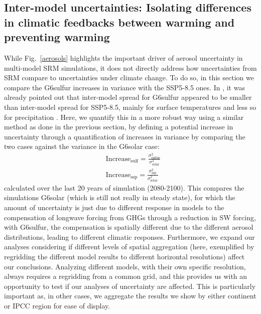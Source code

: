 \documentclass[acp, manuscript]{copernicus}
\begin{document}
\subsection{Inter-model uncertainties: Isolating differences in climatic feedbacks between warming and preventing warming}

While Fig.~\ref{aerosols} highlights the important driver of aerosol uncertainty in multi-model SRM simulations, it does not directly address how uncertainties from SRM compare to uncertainties under climate change. To do so, in this section we compare the G6sulfur increases in variance with the SSP5-8.5 ones. In \cite{Visioni2021}, it was already pointed out that inter-model spread for G6sulfur appeared to be smaller than inter-model spread for SSP5-8.5, mainly for surface temperatures and less so for precipitation \citep[e.g.,][]{MarMartin2015}. Here, we quantify this in a more robust way using a similar method as done in the previous section, by defining a potential increase in uncertainty through a quantification of increases in variance by comparing the two cases against the variance in the G6solar case:
\begin{align}
    &\mbox{Increase}_{\mathrm{sulf}} = \frac{\sigma^2_{\mathrm{sulfur}}}{\sigma^2_{\mathrm{solar}}}\label{eqn.increase.sulf} \\ &\mbox{Increase}_{\mathrm{ssp}} = \frac{\sigma^2_{\mathrm{ssp}}}{\sigma^2_{\mathrm{solar}}}\label{eqn.increase.solar}
\end{align}
calculated over the last 20 years of simulation (2080-2100). This compares the simulations G6solar (which is still not really in steady state), for which the amount of uncertainty is just due to different response in models to the compensation of longwave forcing from GHGs through a reduction in SW forcing, with G6sulfur, the compensation is spatially different due to the different aerosol distributions, leading to different climatic responses. Furthermore, we expand our analyses considering if different levels of spatial aggregation (here, exemplified by regridding the different model results to different horizontal resolutions) affect our conclusions. Analyzing different models, with their own specific resolution, always requires a regridding from a common grid, and this provides us with an opportunity to test if our analyses of uncertainty are affected. This is particularly important as, in other cases, we aggregate the results we show by either continent or IPCC region for ease of display.
\end{document}
